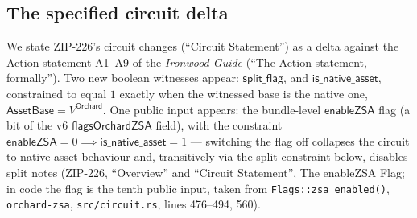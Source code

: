 \documentclass[11pt,a4paper]{article}
\theoremstyle{definition}
\begin{document}
\subsection{The specified circuit delta}\label{sec:zsa-split-circuit}

We state ZIP-226's circuit changes (``Circuit Statement'') as a delta
against the Action statement A1--A9 of the \emph{Ironwood Guide} (``The
Action statement, formally''). Two new boolean witnesses appear:
$\mathsf{split\_flag}$, and $\mathsf{is\_native\_asset}$, constrained to
equal $1$ exactly when the witnessed base is the native one,
$\mathsf{AssetBase} = V^{\mathsf{Orchard}}$. One public input appears: the
bundle-level $\mathsf{enableZSA}$ flag (a bit of the v6
$\mathsf{flagsOrchardZSA}$ field), with the constraint
$\mathsf{enableZSA} = 0 \implies \mathsf{is\_native\_asset} = 1$ ---
switching the flag off collapses the circuit to native-asset behaviour
and, transitively via the split constraint below, disables split notes
(ZIP-226, ``Overview'' and ``Circuit Statement'', The enableZSA Flag; in
code the flag is the tenth public input, taken from
\texttt{Flags::zsa\_enabled()}, \texttt{orchard-zsa},
\texttt{src/circuit.rs}, lines 476--494, 560).
\end{document}
